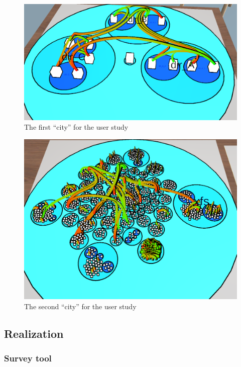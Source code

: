 \begin{figure}[htb]
    \centering
    \includegraphics[width=1\textwidth]{Evaluation/img/city_1.png}
    \caption{The first \enquote{\gls{city}} for the user study}\label{fig:city1}
\end{figure}

\begin{figure}[htb]
    \centering
    \includegraphics[width=1\textwidth]{Evaluation/img/city_2.png}
    \caption{The second \enquote{\gls{city}} for the user study}\label{fig:city2}
\end{figure}

\subsection{Realization}
\subsubsection{Survey tool}

